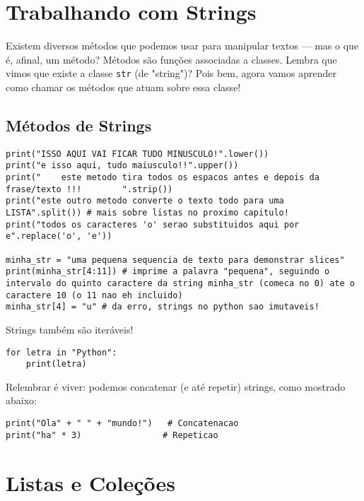 \documentclass[12pt]{book}
\begin{document}
	\chapter{Trabalhando com Strings}
	
	Existem diversos métodos que podemos usar para manipular textos — mas o que é, afinal, um método?  
	Métodos são funções associadas a classes. Lembra que vimos que existe a classe \texttt{str} (de "string")? Pois bem, agora vamos aprender como chamar os métodos que atuam sobre essa classe!

	\section{Métodos de Strings}
	\begin{lstlisting}[caption={Métodos com string}]
print("ISSO AQUI VAI FICAR TUDO MINUSCULO!".lower())
print("e isso aqui, tudo maiusculo!!".upper())
print("    este metodo tira todos os espacos antes e depois da frase/texto !!!        ".strip())
print("este outro metodo converte o texto todo para uma LISTA".split()) # mais sobre listas no proximo capitulo!
print("todos os caracteres 'o' serao substituidos aqui por e".replace('o', 'e'))

minha_str = "uma pequena sequencia de texto para demonstrar slices"
print(minha_str[4:11]) # imprime a palavra "pequena", seguindo o intervalo do quinto caractere da string minha_str (comeca no 0) ate o caractere 10 (o 11 nao eh incluido)
minha_str[4] = "u" # da erro, strings no python sao imutaveis!\end{lstlisting}

	Strings também são iteráveis!

	\begin{lstlisting}[caption={Iterando sobre strings}]
for letra in "Python":
	print(letra)
\end{lstlisting}

	Relembrar é viver: podemos concatenar (e até repetir) strings, como mostrado abaixo:

	\begin{lstlisting}[caption={Concatenação e repetição de strings}]
print("Ola" + " " + "mundo!")   # Concatenacao
print("ha" * 3)                # Repeticao
\end{lstlisting}

	\chapter{Listas e Coleções}
	
\end{document}
